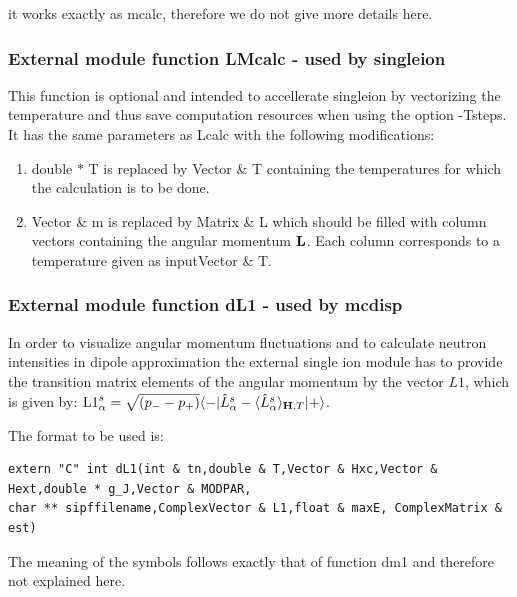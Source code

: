 it works exactly as {\prg mcalc}, therefore we do not give more details here.

\subsubsection{External module function {\prg LMcalc} - used by 
{\prg singleion} }

This function is optional and intended to accellerate {\prg singleion} by vectorizing the temperature and
thus save computation resources when using the option {\prg -Tsteps}. It has the same parameters as 
{\prg Lcalc} with the following modifications:

\begin{enumerate}
\item  {\prg double $\ast$ T} is replaced by {\prg Vector \& T} containing the temperatures for which 
the calculation is to be done.
\item {\prg Vector \& m } is replaced by {\prg Matrix \& L} which should be filled with column
vectors containing the  angular momentum $\mathbf L$. Each column corresponds to a temperature given as input{\prg Vector \& T}.
 \end{enumerate}



\subsubsection{External module function {\prg dL1} - used by {\prg mcdisp}}

In order to visualize angular momentum fluctuations and to calculate neutron intensities
in dipole approximation the external single ion module has to provide the transition
matrix elements of the angular momentum by the
vector $L1$, which is given by:
 ${\rm L1}^s_{\alpha}=\sqrt{(p_--p_+)}\langle -|\hat L^s_{\alpha}-\langle\hat  L^s_{\alpha}\rangle_{\mathbf H,T}|+\rangle$. 

The format to be used is:
{\footnotesize
\begin{verbatim}
extern "C" int dL1(int & tn,double & T,Vector & Hxc,Vector & Hext,double * g_J,Vector & MODPAR,
char ** sipffilename,ComplexVector & L1,float & maxE, ComplexMatrix & est)
\end{verbatim}
}
The meaning of the symbols follows exactly that of function 
{\prg dm1} and therefore not explained here.

